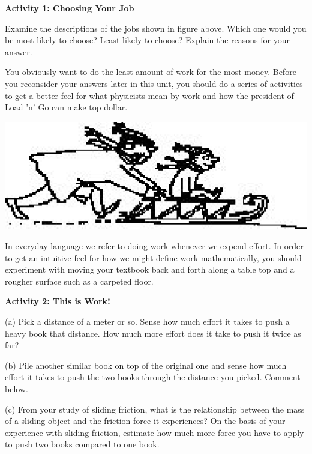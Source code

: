 \textbf{Activity 1: Choosing Your Job }

Examine the descriptions of the jobs shown in figure above. Which one would
you be most likely to choose? Least likely to choose? Explain the reasons for
your answer.
\vspace{30mm}

You obviously want to do the least amount of work for the most money. Before
you reconsider your answers later in this unit, you should do a series of activities
to get a better feel for what physicists mean by work and how the president
of Load 'n' Go can make top dollar.

\vspace{0.3cm}
{\par\centering \includegraphics{work_power_fig2.eps} \par}
\vspace{0.3cm}

In everyday language we refer to doing work whenever we expend effort. In order
to get an intuitive feel for how we might define work mathematically, you should
experiment with moving your textbook back and forth along a table top and a
rougher surface such as a carpeted floor.

\textbf{Activity 2: This is Work!} 

(a) Pick a distance of a meter or so. Sense how much effort it takes to push
a heavy book that distance. How much more effort does it take to push it twice
as far? 
\vspace{20mm}

(b) Pile another similar book on top of the original one and sense how much
effort it takes to push the two books through the distance you picked. Comment
below.
\vspace{20mm}

(c) From your study of sliding friction, what is the relationship between the
mass of a sliding object and the friction force it experiences? On the basis
of your experience with sliding friction, estimate how much more force you have
to apply to push two books compared to one book.
\vspace{20mm}

